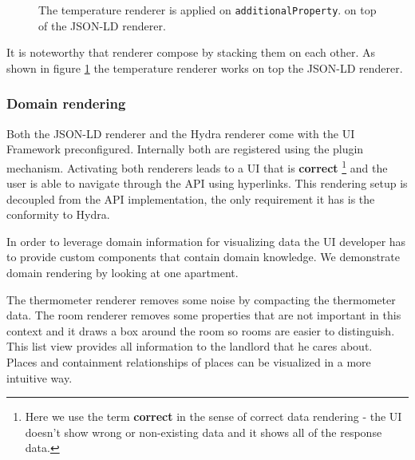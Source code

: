 \begin{figure}[!htb]
  \caption{The temperature renderer is applied on \lstinline{additionalProperty}. on top of the JSON-LD renderer.}
  \label{fig:temperature}
\end{figure}

It is noteworthy that renderer compose by stacking them on each other. As shown in figure \ref{fig:temperature} the temperature renderer works on top the JSON-LD renderer.

\subsubsection{Domain rendering}
Both the JSON-LD renderer and the Hydra renderer come with the UI Framework preconfigured. Internally both are registered using the plugin mechanism. Activating both renderers leads to a UI that is \textbf{correct} \footnote{Here we use the term \textbf{correct} in the sense of correct data rendering - the UI doesn't show wrong or non-existing data and it shows all of the response data.} and the user is able to navigate through the API using hyperlinks. This rendering setup is decoupled from the API implementation, the only requirement it has is the conformity to Hydra.

In order to leverage domain information for visualizing data the UI developer has to provide custom components that contain domain knowledge. We demonstrate domain rendering by looking at one apartment.

The thermometer renderer removes some noise by compacting the thermometer data. The room renderer removes some properties that are not important in this context and it draws a box around the room so rooms are easier to distinguish. This list view provides all information to the landlord that he cares about. \\ Places and containment relationships of places can be visualized in a more intuitive way.

